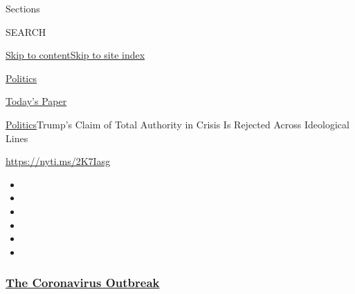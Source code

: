 Sections

SEARCH

\protect\hyperlink{site-content}{Skip to
content}\protect\hyperlink{site-index}{Skip to site index}

\href{https://www.nytimes3xbfgragh.onion/section/politics}{Politics}

\href{https://myaccount.nytimes3xbfgragh.onion/auth/login?response_type=cookie\&client_id=vi}{}

\href{https://www.nytimes3xbfgragh.onion/section/todayspaper}{Today's
Paper}

\href{/section/politics}{Politics}\textbar{}Trump's Claim of Total
Authority in Crisis Is Rejected Across Ideological Lines

\url{https://nyti.ms/2K7Iasg}

\begin{itemize}
\item
\item
\item
\item
\item
\item
\end{itemize}

\hypertarget{the-coronavirus-outbreak}{%
\subsubsection{\texorpdfstring{\href{https://www.nytimes3xbfgragh.onion/news-event/coronavirus?name=styln-coronavirus-national\&region=TOP_BANNER\&block=storyline_menu_recirc\&action=click\&pgtype=Article\&impression_id=c97adcf0-f296-11ea-95f6-af5fc3a8088f\&variant=undefined}{The
Coronavirus
Outbreak}}{The Coronavirus Outbreak}}\label{the-coronavirus-outbreak}}

